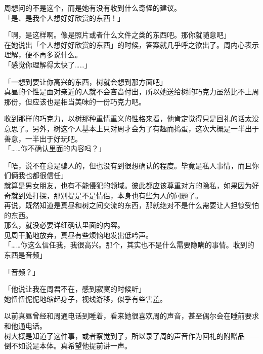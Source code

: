 周想问的不是这个，而是她有没有收到什么奇怪的建议。\\

「是、是我个人想好好欣赏的东西！」

「啊，是这样啊。像是照片或者什么文件之类的东西吧。那你就随意吧」\\

在她说出「个人想好好欣赏的东西」的时候，答案就几乎呼之欲出了。周内心表示理解，便不再多说什么。\\

「感觉你理解得太快了……」

「一想到要让你高兴的东西，树就会想到那方面吧」\\

真昼的个性是面对亲近的人就不会吝啬付出，所以她送给树的巧克力虽然比不上周那份，但应该也是相当美味的一份巧克力吧。

收到那样的巧克力，以树那种重情重义的性格来看，他肯定觉得只是回礼的话太没意思了。另外，树这个人基本上只对周才会为了有趣而捣蛋，这次大概是一半出于善意，一半出于好玩吧。\\

「……你不确认里面的内容吗？」

「唔，说不在意是骗人的，但也没有到很想确认的程度。毕竟是私人事情，而且你们俩我也都很信任」\\

就算是男女朋友，也有不能侵犯的领域。彼此都应该尊重对方的隐私，如果因为好奇就到处打探，那别提是不是情侣，本身也有些为人的问题了。\\

再说，既然知道是真昼和树之间交流的东西，那就绝对不是什么需要让人担惊受怕的东西。\\

那么，就没必要详细确认里面的内容。\\

见周干脆地放弃，真昼有些烦恼地发出低吟声。\\

「……你这么信任我，我很高兴。那个，其实也不是什么需要隐瞒的事情。收到的东西是音频」

「音频？」

「他说让我在周君不在，感到寂寞的时候听」\\

她忸忸怩怩地缩起身子，视线游移，似乎有些害羞。

以前真昼曾经和周通电话到睡着，看来她很喜欢周的声音，甚至偶尔会在睡前要求和他通电话。\\

树大概是知道了这件事，或者察觉到了，所以录了周的声音作为回礼的附赠品——倒不如说是本体。真希望他提前讲一声。\\


